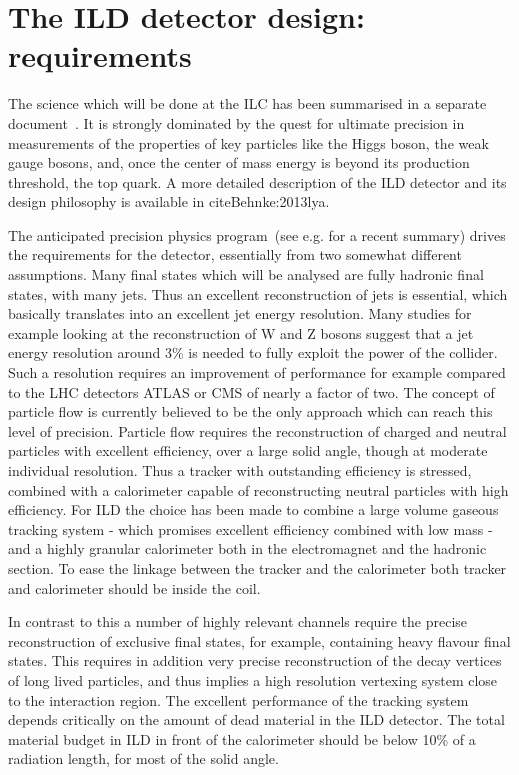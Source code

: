 \documentclass[%
 amsmath,amssymb,
 aps,
]{revtex4-1}
\begin{document}
\section{The ILD detector design: requirements}
The science which will be done at the ILC has been summarised in a separate document~\cite{ILCESU1}. It is strongly dominated by the quest for ultimate precision in measurements of the properties of key particles like the Higgs boson, the weak gauge bosons, and, once the center of mass energy is beyond its production threshold, the top quark. A more detailed description of the ILD detector and its design philosophy is available in cite{Behnke:2013lya}.

The anticipated precision physics program~(see e.g. \cite{Fujii:2017vwa} for a recent summary) drives the requirements for the detector, essentially from two somewhat different assumptions. Many final states which will be analysed are fully hadronic final states, with many jets. Thus an excellent reconstruction of jets is essential, which basically translates into an excellent jet energy resolution. Many studies for example looking at the reconstruction of W and Z bosons suggest that a jet energy resolution around 3\% is needed to fully exploit the power of the collider. Such a resolution requires an improvement of performance for example compared to the LHC detectors ATLAS or CMS of nearly a factor of two. The concept of particle flow is currently believed to be the only approach which can reach this level of precision. Particle flow requires the reconstruction of charged and neutral particles with excellent efficiency, over a large solid angle, though at moderate individual resolution. Thus a tracker with outstanding efficiency is stressed, combined with a calorimeter capable of reconstructing neutral particles with high efficiency. For ILD the choice has been made to combine a large volume gaseous tracking system - which promises excellent efficiency combined with low mass - and a highly granular calorimeter both in the electromagnet and the hadronic section. To ease the linkage between the tracker and the calorimeter both tracker and calorimeter should be inside the coil. 

In contrast to this a number of highly relevant channels require the precise reconstruction of exclusive final states, for example, containing heavy flavour final states. This requires in addition very precise reconstruction of the decay vertices of long lived particles, and thus implies a high resolution vertexing system close to the interaction region. 
The excellent performance of the tracking system  depends critically on the amount of dead material in the ILD detector. The total material budget in ILD in front of the calorimeter should be below 10\% of a radiation length, for most of the solid angle.
\end{document}
